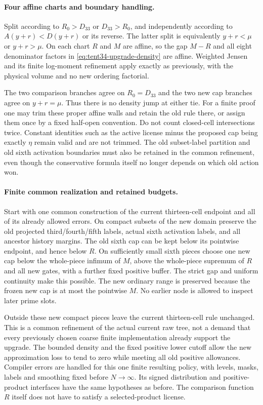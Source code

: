 \paragraph{Four affine charts and boundary handling.}
Split according to $R_0>D_{33}$ or $D_{33}>R_0$, and independently
according to $A(y+r)<D(y+r)$ or its reverse. The latter split is
equivalently $y+r<\mu$ or $y+r>\mu$. On each chart $R$ and $M$
are affine, so the gap $M-R$ and all eight denominator factors
in \eqref{eq:tent34-upgrade-density} are affine. Weighted Jensen
and its finite log-moment refinement apply exactly as previously,
with the physical volume and no new ordering factorial.

The two comparison branches agree on $R_0=D_{33}$ and the two
new cap branches agree on $y+r=\mu$. Thus there is no density jump
at either tie. For a finite proof one may trim these proper affine
walls and retain the old rule there, or assign them once by a fixed
half-open convention. Do not count closed-cell intersections twice.
Constant identities such as the active license minus the proposed
cap being exactly $\eta$ remain valid and are not trimmed.
The old subset-label partition and old sixth activation boundaries
must also be retained in the common refinement, even though the
conservative formula itself no longer depends on which old action won.

\paragraph{Finite common realization and retained budgets.}
Start with one common construction of the current thirteen-cell
endpoint and all of its already allowed errors. On compact subsets
of the new domain preserve the old projected third/fourth/fifth
labels, actual sixth activation labels, and all ancestor history
margins. The old sixth cap can be kept below its pointwise endpoint,
and hence below $R$. On sufficiently small sixth pieces choose one
new cap below the whole-piece infimum of $M$, above the whole-piece
supremum of $R$ and all new gates, with a further fixed positive
buffer. The strict gap and uniform continuity make this possible.
The new ordinary range is preserved because the frozen new cap is
at most the pointwise $M$. No earlier node is allowed to inspect
later prime slots.

Outside these new compact pieces leave the current thirteen-cell
rule unchanged. This is a common refinement of the actual current
raw tree, not a demand that every previously chosen coarse finite
implementation already support the upgrade. The bounded density
and the fixed positive lower cutoff allow the new approximation
loss to tend to zero while meeting all old positive allowances.
Compiler errors are handled for this one finite resulting policy,
with levels, masks, labels and smoothing fixed before $N\to\infty$.
Its signed distribution and positive-product interfaces have the
same hypotheses as before. The comparison function $R$ itself
does not have to satisfy a selected-product license.

